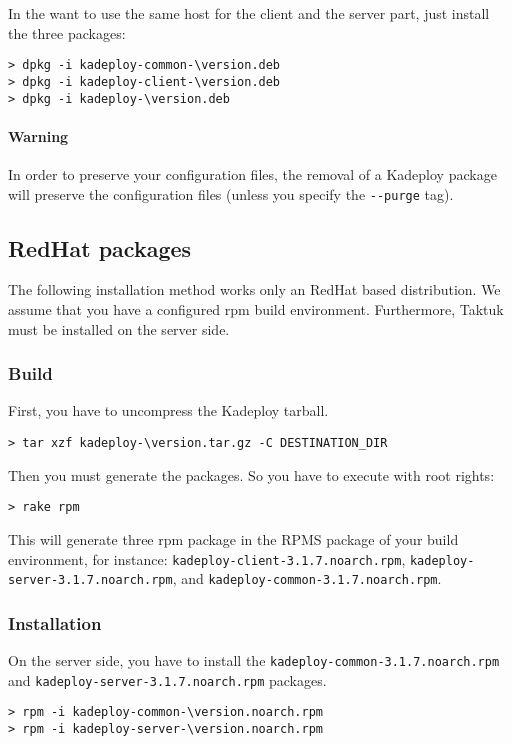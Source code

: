 \documentclass[a4wide,10pt,oneside]{book}
\newcommand{\version}{3.1.7}
\begin{document}
\noindent In the want to use the same host for the client and the server part, just install the three packages:
\begin{small}
\begin{Verbatim}[commandchars=\\\{\}]
> dpkg -i kadeploy-common-\version.deb
> dpkg -i kadeploy-client-\version.deb
> dpkg -i kadeploy-\version.deb
\end{Verbatim}
\end{small}

\paragraph{Warning}
In order to preserve your configuration files, the removal of a Kadeploy package will preserve the configuration files (unless you specify the \texttt{-{}-purge} tag).

\subsection{RedHat packages}
The following installation method works only an RedHat based distribution. We assume that you have a configured rpm build environment. Furthermore, Taktuk must be installed on the server side.
\subsubsection{Build}
\noindent First, you have to uncompress the Kadeploy tarball.
\begin{small}
\begin{Verbatim}[commandchars=\\\{\}]
> tar xzf kadeploy-\version.tar.gz -C DESTINATION_DIR
\end{Verbatim}
\end{small}

\noindent Then you must generate the packages. So you have to execute with root rights:
\begin{small}
\begin{verbatim}
> rake rpm
\end{verbatim}
\end{small}
This will generate three rpm package in the RPMS package of your build environment, for instance: \texttt{kadeploy-client-\version.noarch.rpm}, \texttt{kadeploy-server-\version.noarch.rpm}, and \texttt{kadeploy-common-\version.noarch.rpm}.
\subsubsection{Installation}
\noindent On the server side, you have to install the \texttt{kadeploy-common-\version.noarch.rpm} and \texttt{kadeploy-server-\version.noarch.rpm} packages.
\begin{small}
\begin{Verbatim}[commandchars=\\\{\}]
> rpm -i kadeploy-common-\version.noarch.rpm
> rpm -i kadeploy-server-\version.noarch.rpm
\end{Verbatim}
\end{small}
\end{document}
